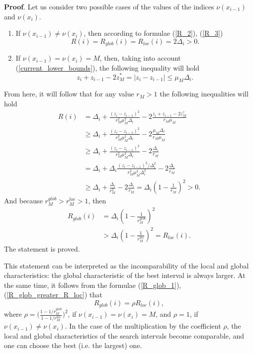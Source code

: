 \documentclass[twocolumn]{svjour3}          %
\begin{document}
	\textbf{Proof}. Let us consider two possible cases of the values of the indices $\nu(x_{i-1})$ and $\nu(x_i)$. 
\begin{enumerate} 
  \item If $\nu(x_{i-1}) \neq \nu(x_i)$, then according to  formulae (\ref{R_2}), (\ref{R_3}) 
\begin{equation}\label{R_glob_1}
	R(i)=R_{glob}(i)=R_{loc}(i)=2\Delta_i>0. 
\end{equation}
  \item If $\nu(x_{i-1}) = \nu(x_i) = M$, then, taking into account (\ref{current_lower_bounds}), the following inequality will hold
$$
	z_i+z_{i-1}-2z_M^* = |z_i-z_{i-1}|\leq \mu_M\Delta_i .
$$
\end{enumerate} 
From here, it will follow that for any value $r_M>1$ the following inequalities will hold
\begin{align}
	R(i) & = \Delta_i + \frac{(z_i-z_{i-1})^2}{r_M^2\mu_M^2\Delta_i} - 2\frac{z_i+z_{i-1}-2z_M^*}{r_M\mu_M} \nonumber \\
	& \geq  \Delta_i + \frac{(z_i-z_{i-1})^2}{r_M^2\mu_M^2\Delta_i} - 2\frac{\mu_M\Delta_i}{r_M\mu_M} \nonumber \\
  & \geq \Delta_i + \frac{(z_i-z_{i-1})^2}{r_M^2\mu_M^2\Delta_i} - 2\frac{\Delta_i}{r_M} \nonumber \\
	& = \Delta_i + \Delta_i\frac{(z_i-z_{i-1})^2/\Delta_i^2}{r_M^2\mu_M^2\Delta_i^2} - 2\frac{\Delta_i}{r_M} \nonumber \\
	& \geq \Delta_i + \frac{\Delta_i}{r_M^2} - 2\frac{\Delta_i}{r_M} = \Delta_i \left( 1-\frac{1}{r_M} \right)^2>0.
\end{align}
And because $r_{M}^{glob} > r_{M}^{loc} > 1$, then
\begin{align}\label{R_glob_greater_R_loc}
	R_{glob}(i) & = \Delta_i\left(1-\frac{1}{r_M^{glob}} \right)^2 \nonumber \\
	& > \Delta_i\left(1-\frac{1}{r_M^{loc}} \right)^2 = R_{loc}(i).
\end{align}
The statement is proved.

	This statement can be interpreted as the incomparability of the local and global characteristics: the global characteristic of the best interval is always larger. At the same time, it follows from the formulae (\ref{R_glob_1}), (\ref{R_glob_greater_R_loc}) that 
\begin{equation}\label{R_glob_equal_R_loc}
	R_{glob}(i) = \rho R_{loc}(i),
\end{equation}
where $\rho=\Big(\frac{1-1/r_{M}^{glob}}{1-1/r_{M}^{loc}}\Big)^2$, if $\nu(x_{i-1})=\nu(x_i)=M$, and $\rho=1$, if $\nu(x_{i-1}) \neq \nu(x_i)$. In the case of the multiplication by the coefficient $\rho$, the local and global characteristics of the search intervals become comparable, and one can choose the best (i.e. the largest) one.
\end{document}
